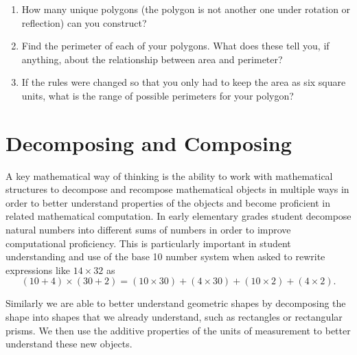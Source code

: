 \documentclass[
]{book}
\providecommand{\tightlist}{%
  \setlength{\itemsep}{0pt}\setlength{\parskip}{0pt}}
\theoremstyle{definition}
\theoremstyle{definition}
\theoremstyle{definition}
\theoremstyle{definition}
\theoremstyle{remark}
\begin{document}
\begin{enumerate}
  \begin{enumerate}
  \def\labelenumii{\alph{enumii}.}
  \tightlist
  \item
    How many unique polygons (the polygon is not another one under rotation or reflection) can you construct?
  \item
    Find the perimeter of each of your polygons. What does these tell you, if anything, about the relationship between area and perimeter?
  \item
    If the rules were changed so that you only had to keep the area as six square units, what is the range of possible perimeters for your polygon?
  \end{enumerate}
\end{enumerate}

\hypertarget{decomposing-and-composing}{%
\section{Decomposing and Composing}\label{decomposing-and-composing}}

A key mathematical way of thinking is the ability to work with mathematical structures to decompose and recompose mathematical objects in multiple ways in order to better understand properties of the objects and become proficient in related mathematical computation. In early elementary grades student decompose natural numbers into different sums of numbers in order to improve computational proficiency. This is particularly important in student understanding and use of the base 10 number system when asked to rewrite expressions like \(14 \times 32\) as \[(10+4)\times (30 +2) = (10 \times 30)+(4\times 30)+(10\times 2)+(4 \times 2).\]

Similarly we are able to better understand geometric shapes by decomposing the shape into shapes that we already understand, such as rectangles or rectangular prisms. We then use the additive properties of the units of measurement to better understand these new objects.
\end{document}
